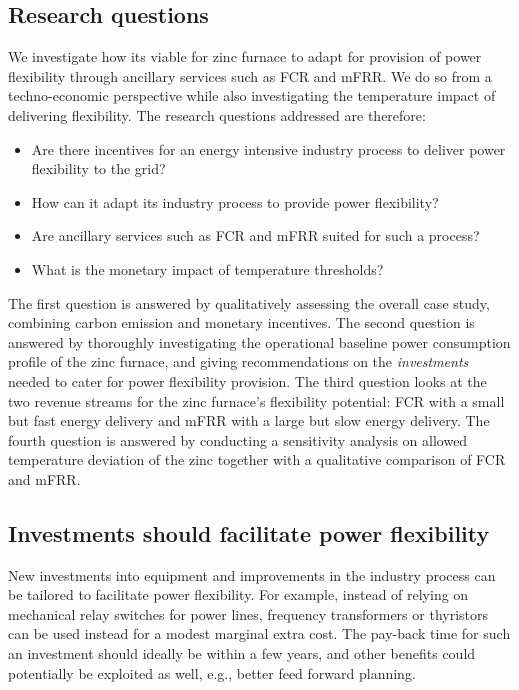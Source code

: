 \documentclass[lettersize,journal]{IEEEtran}
\begin{document}
\subsection{Research questions}

We investigate how its viable for zinc furnace to adapt for provision of power flexibility through ancillary services such as FCR and mFRR. We do so from a techno-economic perspective while also investigating the temperature impact of delivering flexibility. The research questions addressed are therefore:

\IEEEpubidadjcol

\begin{itemize}
    \item Are there incentives for an energy intensive industry process to deliver power flexibility to the grid?
    \item How can it adapt its industry process to provide power flexibility?
    \item Are ancillary services such as FCR and mFRR suited for such a process?
    \item What is the monetary impact of temperature thresholds?
\end{itemize}

The first question is answered by qualitatively assessing the overall case study, combining carbon emission and monetary incentives. The second question is answered by thoroughly investigating the operational baseline power consumption profile of the zinc furnace, and giving recommendations on the \textit{investments} needed to cater for power flexibility provision. The third question looks at the two revenue streams for the zinc furnace's flexibility potential: FCR with a small but fast energy delivery and mFRR with a large but slow energy delivery. The fourth question is answered by conducting a sensitivity analysis on allowed temperature deviation of the zinc together with a qualitative comparison of FCR and mFRR.


\subsection{Investments should facilitate power flexibility}

New investments into equipment and improvements in the industry process can be tailored to facilitate power flexibility. For example, instead of relying on mechanical relay switches for power lines, frequency transformers or thyristors can be used instead for a modest marginal extra cost. The pay-back time for such an investment should ideally be within a few years, and other benefits could potentially be exploited as well, e.g., better feed forward planning.
\end{document}
